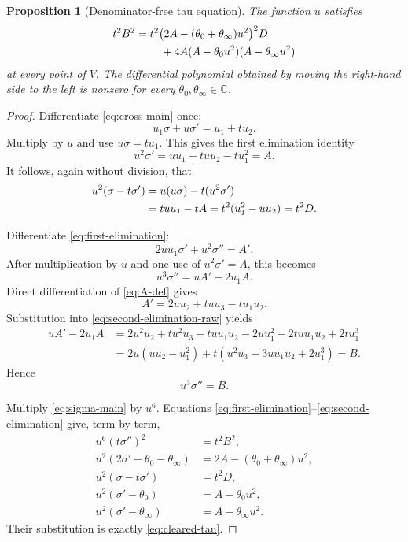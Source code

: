 \documentclass[11pt]{article}
\numberwithin{equation}{section}
\newtheorem{proposition}[theorem]{Proposition}
\theoremstyle{definition}
\theoremstyle{remark}
\newcommand{\C}{\mathbb C}
\begin{document}
\begin{proposition}[Denominator-free tau equation]
\label{prop:tau-equation}
The function $u$ satisfies
\begin{align}
 t^2B^2={}&t^2\bigl(2A-(\theta_0+\theta_\infty)u^2\bigr)^2D
 \notag\\
 &\quad+4A(A-\theta_0u^2)(A-\theta_\infty u^2)
 \label{eq:cleared-tau}
\end{align}
at every point of $V$.  The differential polynomial obtained by moving the right-hand side to
the left is nonzero for every $\theta_0,\theta_\infty\in\C$.
\end{proposition}

\begin{proof}
Differentiate \eqref{eq:cross-main} once:
\[
 u_1\sigma+u\sigma'=u_1+tu_2.
\]
Multiply by $u$ and use $u\sigma=tu_1$.  This gives the first elimination identity
\begin{equation}
 u^2\sigma'=uu_1+tuu_2-tu_1^2=A.
 \label{eq:first-elimination}
\end{equation}
It follows, again without division, that
\begin{align}
 u^2(\sigma-t\sigma')
 &=u(u\sigma)-t(u^2\sigma')
 \notag\\
 &=tuu_1-tA
 =t^2(u_1^2-uu_2)=t^2D.
 \label{eq:difference-elimination}
\end{align}

Differentiate \eqref{eq:first-elimination}:
\[
 2uu_1\sigma'+u^2\sigma''=A'.
\]
After multiplication by $u$ and one use of $u^2\sigma'=A$, this becomes
\begin{equation}
 u^3\sigma''=uA'-2u_1A.
 \label{eq:second-elimination-raw}
\end{equation}
Direct differentiation of \eqref{eq:A-def} gives
\[
 A'=2uu_2+tuu_3-tu_1u_2.
\]
Substitution into \eqref{eq:second-elimination-raw} yields
\begin{align*}
 uA'-2u_1A
 &=2u^2u_2+t u^2u_3-tu u_1u_2
   -2uu_1^2-2tu u_1u_2+2tu_1^3\\
 &=2u(uu_2-u_1^2)
   +t(u^2u_3-3uu_1u_2+2u_1^3)=B.
\end{align*}
Hence
\begin{equation}
 u^3\sigma''=B.
 \label{eq:second-elimination}
\end{equation}

Multiply \eqref{eq:sigma-main} by $u^6$.  Equations
\eqref{eq:first-elimination}--\eqref{eq:second-elimination} give, term by term,
\begin{align*}
 u^6(t\sigma'')^2&=t^2B^2,\\
 u^2(2\sigma'-\theta_0-\theta_\infty)
   &=2A-(\theta_0+\theta_\infty)u^2,\\
 u^2(\sigma-t\sigma')&=t^2D,\\
 u^2(\sigma'-\theta_0)&=A-\theta_0u^2,\\
 u^2(\sigma'-\theta_\infty)&=A-\theta_\infty u^2.
\end{align*}
Their substitution is exactly \eqref{eq:cleared-tau}.


\end{proof}
\end{document}
